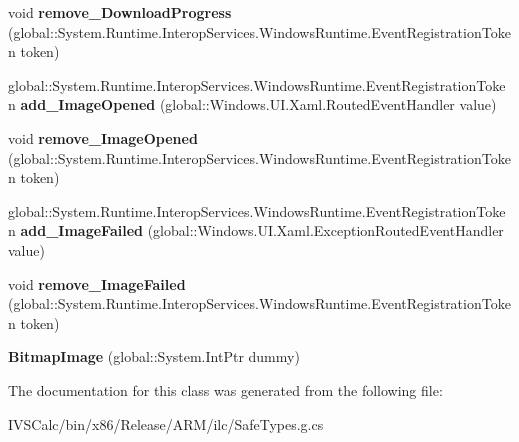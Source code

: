 \begin{DoxyCompactItemize}
\item 
\mbox{\label{class_windows_1_1_u_i_1_1_xaml_1_1_media_1_1_imaging_1_1_bitmap_image_a2eb34dc2eba36825836cc7578bc62ad3}} 
void {\bfseries remove\+\_\+\+Download\+Progress} (global\+::\+System.\+Runtime.\+Interop\+Services.\+Windows\+Runtime.\+Event\+Registration\+Token token)
\item 
\mbox{\label{class_windows_1_1_u_i_1_1_xaml_1_1_media_1_1_imaging_1_1_bitmap_image_a009137ccb3242294d0b233b43447b15e}} 
global\+::\+System.\+Runtime.\+Interop\+Services.\+Windows\+Runtime.\+Event\+Registration\+Token {\bfseries add\+\_\+\+Image\+Opened} (global\+::\+Windows.\+U\+I.\+Xaml.\+Routed\+Event\+Handler value)
\item 
\mbox{\label{class_windows_1_1_u_i_1_1_xaml_1_1_media_1_1_imaging_1_1_bitmap_image_abd3f6dad75c8f3bd98204092748f8218}} 
void {\bfseries remove\+\_\+\+Image\+Opened} (global\+::\+System.\+Runtime.\+Interop\+Services.\+Windows\+Runtime.\+Event\+Registration\+Token token)
\item 
\mbox{\label{class_windows_1_1_u_i_1_1_xaml_1_1_media_1_1_imaging_1_1_bitmap_image_ada8ed4999b6cb99d62a42b9ebf4c4313}} 
global\+::\+System.\+Runtime.\+Interop\+Services.\+Windows\+Runtime.\+Event\+Registration\+Token {\bfseries add\+\_\+\+Image\+Failed} (global\+::\+Windows.\+U\+I.\+Xaml.\+Exception\+Routed\+Event\+Handler value)
\item 
\mbox{\label{class_windows_1_1_u_i_1_1_xaml_1_1_media_1_1_imaging_1_1_bitmap_image_ab71236e1ec9898c1f9eb8269ae973f2f}} 
void {\bfseries remove\+\_\+\+Image\+Failed} (global\+::\+System.\+Runtime.\+Interop\+Services.\+Windows\+Runtime.\+Event\+Registration\+Token token)
\item 
\mbox{\label{class_windows_1_1_u_i_1_1_xaml_1_1_media_1_1_imaging_1_1_bitmap_image_a44808406b9149bd4c36e0a7b1ab40dc8}} 
{\bfseries Bitmap\+Image} (global\+::\+System.\+Int\+Ptr dummy)
\end{DoxyCompactItemize}


The documentation for this class was generated from the following file\+:\begin{DoxyCompactItemize}
\item 
I\+V\+S\+Calc/bin/x86/\+Release/\+A\+R\+M/ilc/Safe\+Types.\+g.\+cs\end{DoxyCompactItemize}
